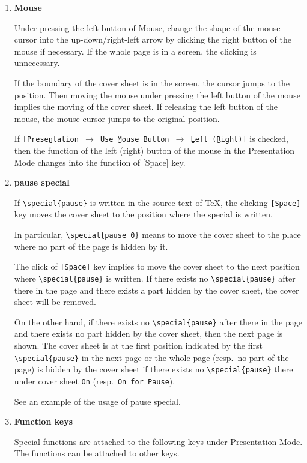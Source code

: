 \documentclass{article}
\begin{document}
\begin{enumerate}
\item {\bf Mouse}

Under pressing the left button of Mouse, change the shape of the mouse cursor 
into the up-down/right-left arrow by clicking the right button of the mouse 
if necessary. If the whole page is in a screen, the clicking is unnecessary.

If the boundary of the cover sheet is in the screen, the cursor jumps to the position. Then moving the mouse under pressing the left button of the mouse implies the moving of the cover sheet. If releasing the left button of the mouse, the mouse cursor jumps to the original position.

If {\tt[Prese\b{n}tation $\to$ Use \b{M}ouse Button $\to$ \b{L}eft 
(\b{R}ight)]} is checked, then the function of the left (right) button of the 
mouse in the Presentation Mode changes into the function of [Space] key. 

\item {\bf pause special}

If \verb|\special{pause}| is written in the source text of \TeX, 
the clicking \verb|[Space]| key moves the cover sheet to the position where 
the special is written.

In particular, \verb|\special{pause 0}| means to move the cover sheet to the 
place where no part of the page is hidden by it.

The click of \verb|[Space]| key implies to move the cover sheet to the next 
position where \verb|\special{pause}| is written. 
If there exists no \verb|\special{pause}| after there in the page and there 
exists a part hidden by the cover sheet, the cover sheet will be removed. 

On the other hand, if there exists no \verb|\special{pause}| after there in 
the page and there exists no part hidden by the cover sheet, then the next page is shown. 
The cover sheet is at the first position indicated by the first 
\verb|\special{pause}| in the next page or the whole page (resp.~no part of 
the page) is hidden by the cover sheet if there exists 
no \verb|\special{pause}| there under cover sheet {\tt On} 
(resp.~{\tt On for Pause}).

See an example of the usage of pause special.

\item {\bf Function keys}

Special functions are attached to the following keys under Presentation Mode. 
The functions can be attached to other keys.


\end{enumerate}
\end{document}
